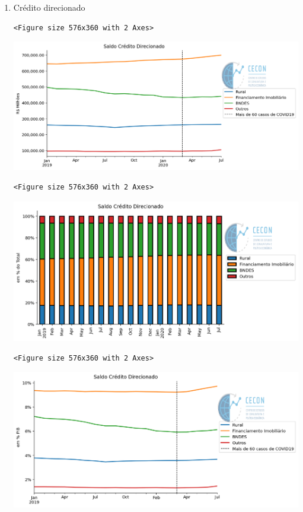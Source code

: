 \documentclass[11pt]{article}
\begin{document}
\begin{enumerate}
\item Crédito direcionado
\label{sec:org60530d1}


\begin{verbatim}
<Figure size 576x360 with 2 Axes>
\end{verbatim}


\begin{center}
\includegraphics[width=.9\linewidth]{obipy-resources/62e383af79e91b63c7fc98dd7fb55b3c3ececcb9/8e80f62dee7a7da5353be6056c7d954dc453835e.png}
\end{center}

\begin{verbatim}
<Figure size 576x360 with 2 Axes>
\end{verbatim}


\begin{center}
\includegraphics[width=.9\linewidth]{obipy-resources/62e383af79e91b63c7fc98dd7fb55b3c3ececcb9/9a2b55ba48387fe773ae71f452b084dae90c5a91.png}
\end{center}

\begin{verbatim}
<Figure size 576x360 with 2 Axes>
\end{verbatim}


\begin{center}
\includegraphics[width=.9\linewidth]{obipy-resources/62e383af79e91b63c7fc98dd7fb55b3c3ececcb9/9d5911f91378331c30c8ae9b513d4af5c47cd126.png}
\end{center}
\end{enumerate}
\end{document}

